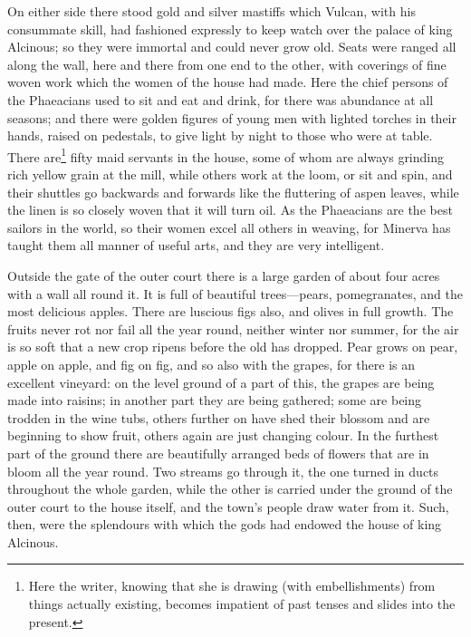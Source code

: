 On either side there stood gold and silver mastiffs which Vulcan, with his
consummate skill, had fashioned expressly to keep watch over the palace of king
Alcinous; so they were immortal and could never grow old. Seats were ranged all
along the wall, here and there from one end to the other, with coverings of
fine woven work which the women of the house had made. Here the chief persons
of the Phaeacians used to sit and eat and drink, for there was abundance at all
seasons; and there were golden figures of young men with lighted torches in
their hands, raised on pedestals, to give light by night to those who were at
table. There are\footnote{Here the writer, knowing that she is drawing (with embellishments) from
things actually existing, becomes impatient of past tenses and slides into the
present.} fifty maid servants in the house,
some of whom are always grinding rich yellow grain at the mill, while others
work at the loom, or sit and spin, and their shuttles go backwards and forwards
like the fluttering of aspen leaves, while the linen is so closely woven that
it will turn oil. As the Phaeacians are the best sailors in the world, so their
women excel all others in weaving, for Minerva has taught them all manner of
useful arts, and they are very intelligent.

Outside the gate of the outer court there is a large garden of about four acres
with a wall all round it. It is full of beautiful trees—pears, pomegranates,
and the most delicious apples. There are luscious figs also, and olives in full
growth. The fruits never rot nor fail all the year round, neither winter nor
summer, for the air is so soft that a new crop ripens before the old has
dropped. Pear grows on pear, apple on apple, and fig on fig, and so also with
the grapes, for there is an excellent vineyard: on the level ground of a part
of this, the grapes are being made into raisins; in another part they are being
gathered; some are being trodden in the wine tubs, others further on have shed
their blossom and are beginning to show fruit, others again are just changing
colour. In the furthest part of the ground there are beautifully arranged beds
of flowers that are in bloom all the year round. Two streams go through it, the
one turned in ducts throughout the whole garden, while the other is carried
under the ground of the outer court to the house itself, and the town’s people
draw water from it. Such, then, were the splendours with which the gods had
endowed the house of king Alcinous.

